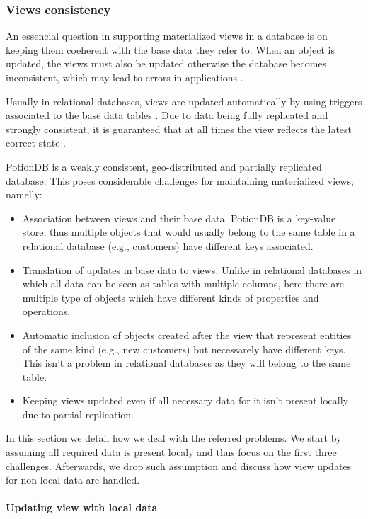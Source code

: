 \documentclass{vldb}
\begin{document}
\subsubsection{Views consistency}
\label{subsec:viewsconsistency}

An essencial question in supporting materialized views in a database is on keeping them coeherent with the base data they refer to.
When an object is updated, the views must also be updated otherwise the database becomes inconsistent, which may lead to errors in applications \cite{???}.

Usually in relational databases, views are updated automatically by using triggers associated to the base data tables \cite{???}.
Due to data being fully replicated and strongly consistent, it is guaranteed that at all times the view reflects the latest correct state \cite{???}.

PotionDB is a weakly consistent, geo-distributed and partially replicated database.
This poses considerable challenges for maintaining materialized views, namelly:
\begin{itemize}
	\item Association between views and their base data. 
	PotionDB is a key-value store, thus multiple objects that would usually belong to the same table in a relational database (e.g., customers) have different keys associated.
	\item Translation of updates in base data to views. 
	Unlike in relational databases in which all data can be seen as tables with multiple columns, here there are multiple type of objects which have different kinds of properties and operations.
	\item Automatic inclusion of objects created after the view that represent entities of the same kind (e.g., new customers) but necessarely have different keys.
	This isn't a problem in relational databases as they will belong to the same table.
	\item Keeping views updated even if all necessary data for it isn't present locally due to partial replication.
\end{itemize}

In this section we detail how we deal with the referred problems.
We start by assuming all required data is present localy and thus focus on the first three challenges.
Afterwards, we drop such assumption and discuss how view updates for non-local data are handled.

\paragraph{Updating view with local data}
\end{document}

